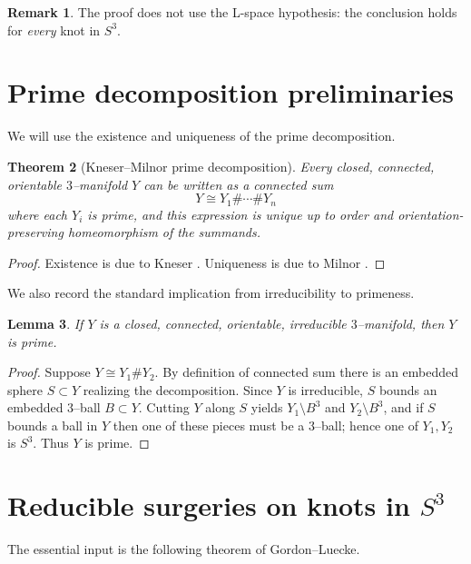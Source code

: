 \documentclass[11pt]{article}
\newtheorem{theorem}{Theorem}[section]
\newtheorem{lemma}[theorem]{Lemma}
\theoremstyle{definition}
\newtheorem{remark}[theorem]{Remark}
\begin{document}
\begin{remark}
The proof does not use the L-space hypothesis: the conclusion holds for \emph{every} knot in $S^3$.
\end{remark}

\section{Prime decomposition preliminaries}

We will use the existence and uniqueness of the prime decomposition.

\begin{theorem}[Kneser--Milnor prime decomposition]\label{thm:kneser-milnor}
Every closed, connected, orientable $3$--manifold $Y$ can be written as a connected sum
\[
Y \cong Y_1 \# \cdots \# Y_n
\]
where each $Y_i$ is prime, and this expression is unique up to order and orientation-preserving homeomorphism of the summands.
\end{theorem}

\begin{proof}
Existence is due to Kneser \cite{Kneser29}. Uniqueness is due to Milnor \cite{Milnor62}.
\end{proof}

We also record the standard implication from irreducibility to primeness.

\begin{lemma}\label{lem:irr-implies-prime}
If $Y$ is a closed, connected, orientable, \emph{irreducible} $3$--manifold, then $Y$ is prime.
\end{lemma}

\begin{proof}
Suppose $Y\cong Y_1\#Y_2$. By definition of connected sum there is an embedded sphere $S\subset Y$ realizing the decomposition. Since $Y$ is irreducible, $S$ bounds an embedded $3$--ball $B\subset Y$. Cutting $Y$ along $S$ yields $Y_1\setminus B^3$ and $Y_2\setminus B^3$, and if $S$ bounds a ball in $Y$ then one of these pieces must be a $3$--ball; hence one of $Y_1,Y_2$ is $S^3$. Thus $Y$ is prime.
\end{proof}

\section{Reducible surgeries on knots in \texorpdfstring{$S^3$}{S3}}

The essential input is the following theorem of Gordon--Luecke.
\end{document}
